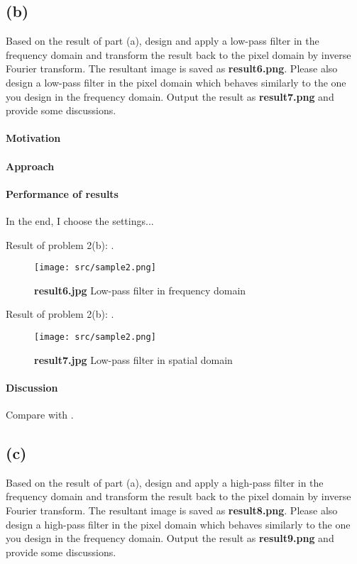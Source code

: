 \subsection{(b)}\label{2_b}
Based on the result of part (a), design and apply a low-pass filter in the frequency domain and transform the result back to the pixel domain by inverse Fourier transform. The resultant image is saved as \textbf{result6.png}. Please also design a low-pass filter in the pixel domain which behaves similarly to the one you design in the frequency domain. Output the result as \textbf{result7.png} and provide some discussions.

\paragraph{Motivation}

\paragraph{Approach}

\paragraph{Performance of results}
In the end, I choose the \alert{settings}...

Result of problem 2(b): .
\begin{figure}
    \centering
    \texttt{[image: src/sample2.png]}
    \caption{\textbf{result6.jpg} Low-pass filter in frequency domain}
    \label{result6}
\end{figure}

Result of problem 2(b): .
\begin{figure}
    \centering
    \texttt{[image: src/sample2.png]}
    \caption{\textbf{result7.jpg} Low-pass filter in spatial domain}
    \label{result7}
\end{figure}

\paragraph{Discussion}
Compare  with .

\subsection{(c)}\label{2_c}
Based on the result of part (a), design and apply a high-pass filter in the frequency domain and transform the result back to the pixel domain by inverse Fourier transform. The resultant image is saved as \textbf{result8.png}. Please also design a high-pass filter in the pixel domain which behaves similarly to the one you design in the frequency domain. Output the result as \textbf{result9.png} and provide some discussions.

